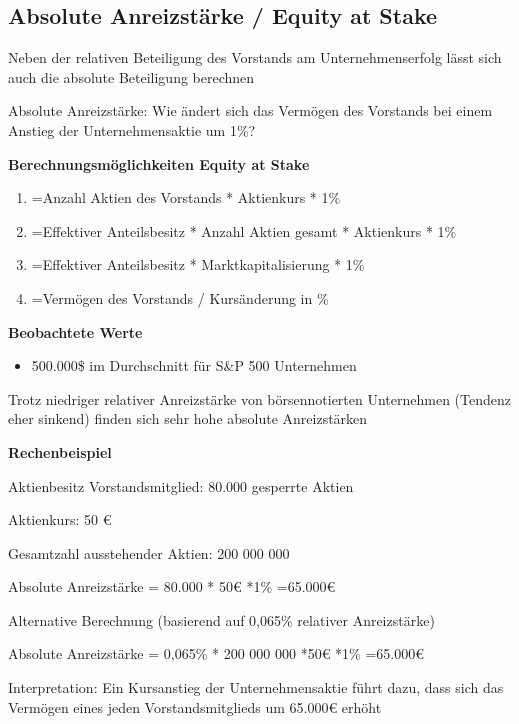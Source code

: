 \documentclass[
]{article}
\providecommand{\tightlist}{%
  \setlength{\itemsep}{0pt}\setlength{\parskip}{0pt}}
\begin{document}
\hypertarget{absolute-anreizstuxe4rke-equity-at-stake}{%
\subsection{Absolute Anreizstärke / Equity at
Stake}\label{absolute-anreizstuxe4rke-equity-at-stake}}

Neben der relativen Beteiligung des Vorstands am Unternehmenserfolg
lässt sich auch die absolute Beteiligung berechnen

Absolute Anreizstärke: Wie ändert sich das Vermögen des Vorstands bei
einem Anstieg der Unternehmensaktie um 1\%?

\textbf{Berechnungsmöglichkeiten Equity at Stake}

\begin{enumerate}
\def\labelenumi{\arabic{enumi}.}
\tightlist
\item
  =Anzahl Aktien des Vorstands * Aktienkurs * 1\%
\item
  =Effektiver Anteilsbesitz * Anzahl Aktien gesamt * Aktienkurs * 1\%
\item
  =Effektiver Anteilsbesitz * Marktkapitalisierung * 1\%
\item
  =Vermögen des Vorstands / Kursänderung in \%
\end{enumerate}

\textbf{Beobachtete Werte}

\begin{itemize}
\tightlist
\item
  500.000\$ im Durchschnitt für S\&P 500 Unternehmen
\end{itemize}

Trotz niedriger relativer Anreizstärke von börsennotierten Unternehmen
(Tendenz eher sinkend) finden sich sehr hohe absolute Anreizstärken

\textbf{Rechenbeispiel }

Aktienbesitz Vorstandsmitglied: 80.000 gesperrte Aktien

Aktienkurs: 50 €

Gesamtzahl ausstehender Aktien: 200 000 000

Absolute Anreizstärke = 80.000 * 50€ *1\% =65.000€

Alternative Berechnung (basierend auf 0,065\% relativer Anreizstärke)

Absolute Anreizstärke = 0,065\% * 200 000 000 *50€ *1\% =65.000€

Interpretation: Ein Kursanstieg der Unternehmensaktie führt dazu, dass
sich das Vermögen eines jeden Vorstandsmitglieds um 65.000€ erhöht
\end{document}
